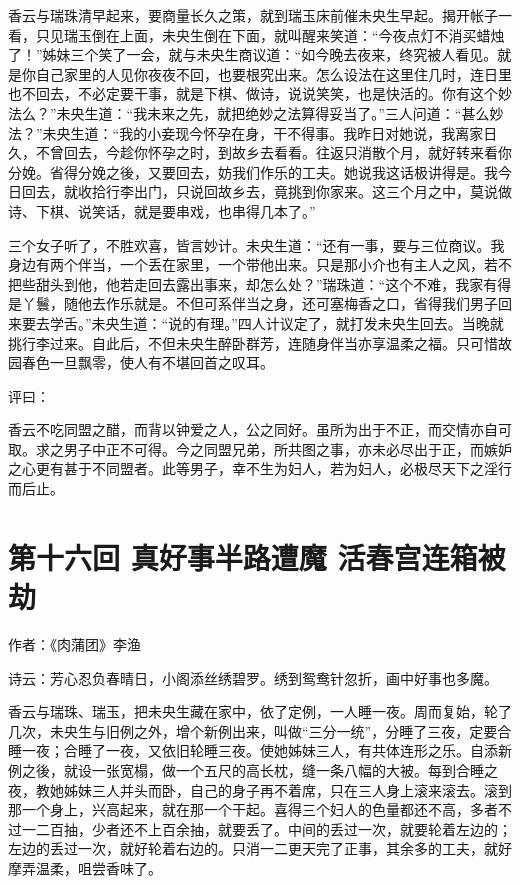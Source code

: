 \documentclass[a4paper,12pt,UTF8,twoside]{ctexbook}
\begin{document}
香云与瑞珠清早起来，要商量长久之策，就到瑞玉床前催未央生早起。揭开帐子一看，只见瑞玉倒在上面，未央生倒在下面，就叫醒来笑道：“今夜点灯不消买蜡烛了！”姊妹三个笑了一会，就与未央生商议道：“如今晚去夜来，终究被人看见。就是你自己家里的人见你夜夜不回，也要根究出来。怎么设法在这里住几时，连日里也不回去，不必定要干事，就是下棋、做诗，说说笑笑，也是快活的。你有这个妙法么？”未央生道：“我未来之先，就把绝妙之法算得妥当了。”三人问道：“甚么妙法？”未央生道：“我的小妾现今怀孕在身，干不得事。我昨日对她说，我离家日久，不曾回去，今趁你怀孕之时，到故乡去看看。往返只消散个月，就好转来看你分娩。省得分娩之後，又要回去，妨我们作乐的工夫。她说我这话极讲得是。我今日回去，就收拾行李出门，只说回故乡去，竟挑到你家来。这三个月之中，莫说做诗、下棋、说笑话，就是要串戏，也串得几本了。”

三个女子听了，不胜欢喜，皆言妙计。未央生道：“还有一事，要与三位商议。我身边有两个伴当，一个丢在家里，一个带他出来。只是那小介也有主人之风，若不把些甜头到他，他若走回去露出事来，却怎么处？”瑞珠道：“这个不难，我家有得是丫鬟，随他去作乐就是。不但可系伴当之身，还可塞梅香之口，省得我们男子回来要去学舌。”未央生道：“说的有理。”四人计议定了，就打发未央生回去。当晚就挑行李过来。自此后，不但未央生醉卧群芳，连随身伴当亦享温柔之福。只可惜故园春色一旦飘零，使人有不堪回首之叹耳。

评曰：

香云不吃同盟之醋，而背以钟爱之人，公之同好。虽所为出于不正，而交情亦自可取。求之男子中正不可得。今之同盟兄弟，所共图之事，亦未必尽出于正，而嫉妒之心更有甚于不同盟者。此等男子，幸不生为妇人，若为妇人，必极尽天下之淫行而后止。

\chapter{第十六回 真好事半路遭魔 活春宫连箱被劫}

作者：《肉蒲团》李渔

诗云：芳心忍负春晴日，小阁添丝绣碧罗。绣到鸳鸯针忽折，画中好事也多魔。

香云与瑞珠、瑞玉，把未央生藏在家中，依了定例，一人睡一夜。周而复始，轮了几次，未央生与旧例之外，增个新例出来，叫做“三分一统”，分睡了三夜，定要合睡一夜；合睡了一夜，又依旧轮睡三夜。使她姊妹三人，有共体连形之乐。自添新例之後，就设一张宽榻，做一个五尺的高长枕，缝一条八幅的大被。每到合睡之夜，教她姊妹三人并头而卧，自己的身子再不着席，只在三人身上滚来滚去。滚到那一个身上，兴高起来，就在那一个干起。喜得三个妇人的色量都还不高，多者不过一二百抽，少者还不上百余抽，就要丢了。中间的丢过一次，就要轮着左边的；左边的丢过一次，就好轮着右边的。只消一二更天完了正事，其余多的工夫，就好摩弄温柔，咀尝香味了。
\end{document}
